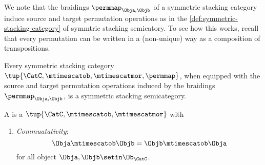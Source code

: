 {\begin{ctdefinition}
    \end{ctdefinition}
   


    
    We note that the braidings $\permmap_{\Obja, \Objb}$ of a symmetric stacking category induce source and target permutation operations as in the \cref{def:symmetric-stacking-category} of symmtric stacking semicatory. To see how this works, recall that every permutation can be written in a (non-unique) way as a composition of transpositions. 
    
        \begin{lemma}
    Every symmetric stacking category $\tup{\CatC, \mtimescatob, \mtimescatmor, \permmap}$, when equipped with the source and target permutation operations induced by the braidings $\permmap_{\Obja, \Objb}$, is a symmetric stacking semicategory.  
    \end{lemma}
    


    \begin{ctdefinition}
        \label{def:commutative-stacking-cat}
        A  is a  $\tup{\CatC, \mtimescatob, \mtimescatmor}$ with

        \condit

        \begin{enumerate}
            \item \emph{Commuatativity}:
                  \begin{equation}
                      \Obja \mtimescatob \Objb = \Objb \mtimescatob \Obja
                  \end{equation}
                  for all object $\Obja, \Objb \setin \Ob_\CatC$.
        \end{enumerate}
    \end{ctdefinition}

    


}
